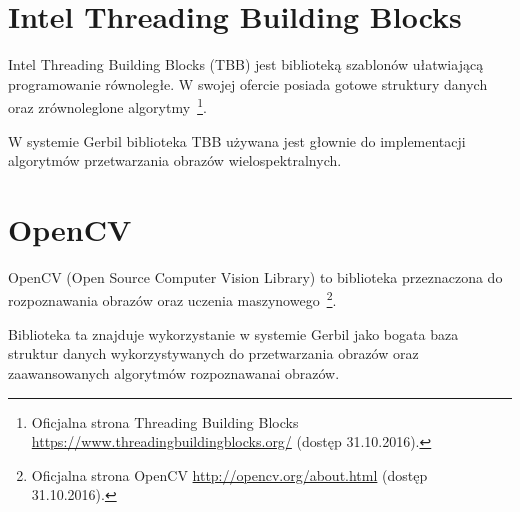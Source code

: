  \section{Intel Threading Building Blocks}
Intel Threading Building Blocks (TBB) jest biblioteką szablonów ułatwiającą programowanie równoległe. W swojej ofercie posiada gotowe struktury danych oraz zrównoleglone algorytmy~\footnote{Oficjalna strona Threading Building Blocks \url{https://www.threadingbuildingblocks.org/} (dostęp 31.10.2016).}.

W systemie Gerbil biblioteka TBB używana jest głownie do implementacji algorytmów przetwarzania obrazów wielospektralnych.

 \section{OpenCV}
OpenCV (Open Source Computer Vision Library) to biblioteka przeznaczona do rozpoznawania obrazów oraz uczenia maszynowego~\footnote{Oficjalna strona OpenCV \url{http://opencv.org/about.html} (dostęp 31.10.2016).}.

Biblioteka ta znajduje wykorzystanie w systemie Gerbil jako bogata baza struktur danych wykorzystywanych do przetwarzania obrazów oraz zaawansowanych algorytmów rozpoznawanai obrazów.